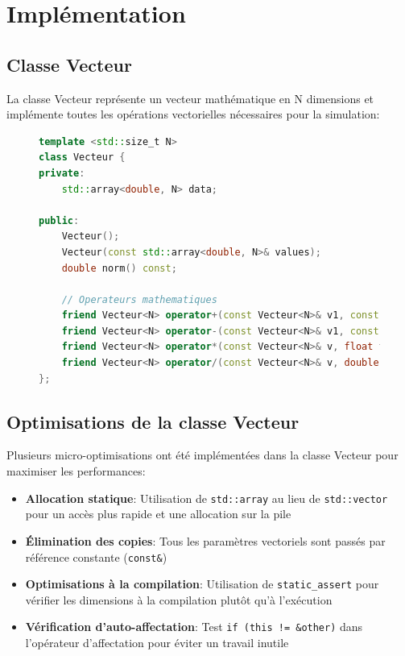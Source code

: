\documentclass[12pt,a4paper]{article}
\begin{document}
\section{Implémentation}

\subsection{Classe Vecteur}

La classe Vecteur représente un vecteur mathématique en N dimensions et implémente toutes les opérations vectorielles nécessaires pour la simulation:

\begin{figure}[H]
\begin{lstlisting}[language=C++, caption=Extrait de la classe Vecteur]
template <std::size_t N>
class Vecteur {
private:
    std::array<double, N> data;

public:
    Vecteur();
    Vecteur(const std::array<double, N>& values);
    double norm() const;
    
    // Operateurs mathematiques
    friend Vecteur<N> operator+(const Vecteur<N>& v1, const Vecteur<N>& v2);
    friend Vecteur<N> operator-(const Vecteur<N>& v1, const Vecteur<N>& v2);
    friend Vecteur<N> operator*(const Vecteur<N>& v, float f);
    friend Vecteur<N> operator/(const Vecteur<N>& v, double d);
};
\end{lstlisting}
\end{figure}

\subsection{Optimisations de la classe Vecteur}

Plusieurs micro-optimisations ont été implémentées dans la classe Vecteur pour maximiser les performances:

\begin{itemize}
    \item \textbf{Allocation statique}: Utilisation de \texttt{std::array} au lieu de \texttt{std::vector} pour un accès plus rapide et une allocation sur la pile
    \item \textbf{Élimination des copies}: Tous les paramètres vectoriels sont passés par référence constante (\texttt{const\&})
    \item \textbf{Optimisations à la compilation}: Utilisation de \texttt{static\_assert} pour vérifier les dimensions à la compilation plutôt qu'à l'exécution
    \item \textbf{Vérification d'auto-affectation}: Test \texttt{if (this != \&other)} dans l'opérateur d'affectation pour éviter un travail inutile
\end{itemize}
\end{document}
